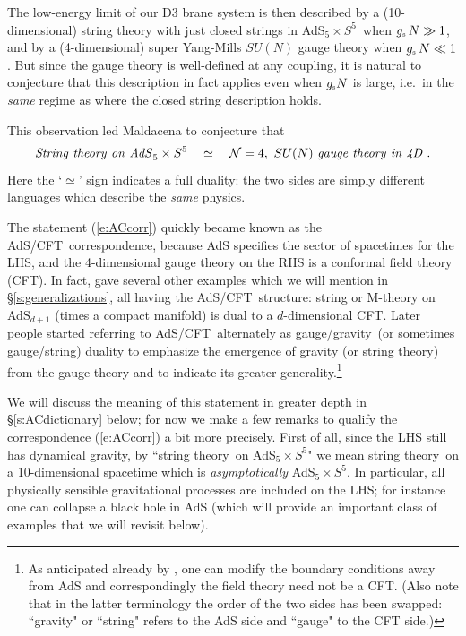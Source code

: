 \documentclass[12pt,a4paper]{article}
\def\sect#1{\S\ref{#1}}
\def\req#1{(\ref{#1})}
\def\AC{AdS/CFT}
\def\GG{gauge/gravity}
\def\STY{string theory}
\def\gst{g_{\scriptscriptstyle {\rm s}}}
\def\adss#1#2{AdS$_{#1} \times S^{#2}$}
\def\dual{\simeq}
\begin{document}
The low-energy limit of our D3 brane system is then described by a (10-dimensional) string theory with just closed strings in \adss55\ when $\gst \, N \gg 1$, and by a (4-dimensional) super Yang-Mills $SU(N)$ gauge theory when $\gst \, N \ll 1$.  But since the gauge theory is well-defined at any coupling, it is natural to conjecture that this description in fact applies even when $\gst N$ is large, i.e.\ in the {\it same} regime as where the closed string description holds.

This observation led Maldacena \cite{Maldacena:1997re} to conjecture that
%
\begin{equation}
{\it 
String \ theory  \ on  \  AdS}_5 \times S^5
\quad \dual \quad
{\cal N} = 4, \ SU(N) \ {\it gauge \ theory \ in \ 4D} \ .
\label{e:ACcorr}
\end{equation}	
%
Here the `$\dual$' sign indicates a full duality:  the two sides are simply  different languages which describe the {\it same} physics. 

The statement \req{e:ACcorr} quickly became known as the \AC\ correspondence, because AdS specifies the sector of spacetimes for the LHS, and the 4-dimensional gauge theory on the RHS is a conformal field theory (CFT).  In fact, \cite{Maldacena:1997re} gave several other examples which we will mention in \sect{s:generalizations}, all having the \AC\ structure: string or M-theory on AdS$_{d+1}$ (times a compact manifold) is dual to a $d$-dimensional CFT.
Later people started referring to \AC\ alternately as \GG\ (or sometimes gauge/string) duality to emphasize the emergence of gravity (or string theory) from the gauge theory and  to indicate its greater generality.\footnote{
As anticipated already by \cite{Maldacena:1997re}, one can modify the boundary conditions away from AdS and correspondingly the field theory need not be a CFT.   (Also note that in the latter terminology the order of the two sides has been swapped:  ``gravity" or ``string" refers to the AdS side and  ``gauge"  to the CFT side.)
}

We will discuss the meaning of this statement in greater depth in  \sect{s:ACdictionary} below; for now we make a few remarks to qualify the correspondence \req{e:ACcorr} a bit more precisely.  First of all, since the LHS still has dynamical gravity, by ``\STY\ on \adss55" we mean \STY\ on a 10-dimensional spacetime which is {\it asymptotically} \adss55.  In particular, all physically sensible gravitational processes are included on the LHS; for instance one can collapse a black hole in AdS (which will provide an important class of examples that we will revisit below).
\end{document}
